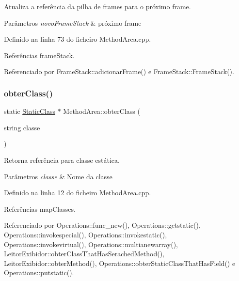 Atualiza a referência da pilha de frames para o próximo frame. 


\begin{DoxyParams}{Parâmetros}
{\em novo\+Frame\+Stack} & próximo frame \\
\hline
\end{DoxyParams}


Definido na linha 73 do ficheiro Method\+Area.\+cpp.



Referências frame\+Stack.



Referenciado por Frame\+Stack\+::adicionar\+Frame() e Frame\+Stack\+::\+Frame\+Stack().

\mbox{\label{classMethodArea_a6e9d922892887daadd4624729268094f}} 
\subsubsection{\texorpdfstring{obter\+Class()}{obterClass()}}
{\footnotesize\ttfamily static \hyperlink{classStaticClass}{Static\+Class} $\ast$ Method\+Area\+::obter\+Class (\begin{DoxyParamCaption}\item[{string}]{classe }\end{DoxyParamCaption})\hspace{0.3cm}{\ttfamily [static]}}



Retorna referência para classe estática. 


\begin{DoxyParams}{Parâmetros}
{\em classe} & Nome da classe \\
\hline
\end{DoxyParams}


Definido na linha 12 do ficheiro Method\+Area.\+cpp.



Referências map\+Classes.



Referenciado por Operations\+::func\+\_\+new(), Operations\+::getstatic(), Operations\+::invokespecial(), Operations\+::invokestatic(), Operations\+::invokevirtual(), Operations\+::multianewarray(), Leitor\+Exibidor\+::obter\+Class\+That\+Has\+Serached\+Method(), Leitor\+Exibidor\+::obter\+Method(), Operations\+::obter\+Static\+Class\+That\+Has\+Field() e Operations\+::putstatic().



